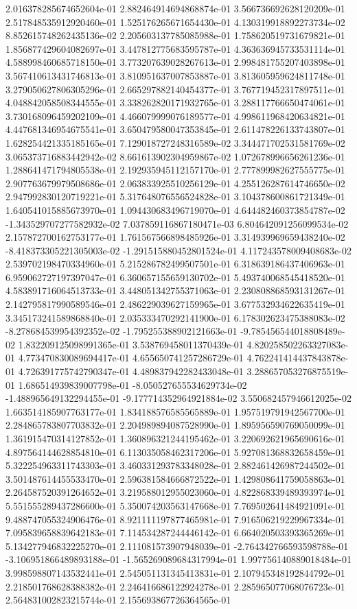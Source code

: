 2.016378285674652604e-01	2.882464914694868874e-01	3.566736692628120209e-01	2.517848535912920460e-01	1.525176265671654430e-01	4.130319918892273734e-02	8.852615748262435136e-02	2.205603137785085988e-01	1.758620519731679821e-01	1.856877429604082697e-01	3.447812775683595787e-01	4.363636945733531114e-01	4.588998460685718150e-01	3.773207639028267613e-01	2.998481755207403898e-01	3.567410613431746813e-01	3.810951637007853887e-01	3.813605959624811748e-01	3.279050627806305296e-01	2.665297882140454377e-01	3.767719452317897511e-01	4.048842058508344555e-01	3.338262820171932765e-01	3.288117766650474061e-01	3.730168096459202109e-01	4.466079999076189577e-01	4.998611968420634821e-01	4.447681346954675541e-01	3.650479580047353845e-01	2.611478226133743807e-01	1.628254421335185165e-01	7.129018727248316589e-02	3.344471702531581769e-02	3.065373716883442942e-02	8.661613902304959867e-02	1.072678996656261236e-01	1.288641471794805538e-01	2.192935945112157170e-01	2.777899982627555775e-01	2.907763679979508686e-01	2.063833925510256129e-01	4.255126287614746650e-02	2.947992830120719221e-01	5.317648076556524828e-01	3.104378600861721349e-01	1.640541015885673970e-01	1.094430683496719070e-01	4.644482460373854787e-02	-1.343529707277582932e-02	7.037859116867180471e-03	6.804642091256099534e-02	2.157872700162753177e-01	1.761567566898485926e-01	3.314939969659438240e-02	-8.418373305221305003e-02	-1.291515880452801524e-01	4.117243578009408683e-02	2.539702198470334960e-01	5.215286782499507501e-01	6.318639186437406963e-01	6.959062727197397047e-01	6.360657155659130702e-01	5.493740068545418520e-01	4.583891716064513733e-01	3.448051342755371063e-01	2.230808868593131267e-01	2.142795817990589546e-01	2.486229039627159965e-01	3.677532934622635419e-01	3.345173241589868840e-01	2.035333470292141900e-01	6.178302623475388083e-02	-8.278684539954392352e-02	-1.795255388902121663e-01	-9.785456544018808489e-02	1.832209125098991365e-01	3.538769458011370439e-01	4.820258502263327083e-01	4.773470830089694417e-01	4.655650741257286729e-01	4.762241414437843878e-01	4.726391775742790347e-01	4.489837942282433048e-01	3.288657053276875519e-01	1.686514939839007798e-01	-8.050527655534629734e-02	-1.488965649132294455e-01	-9.177714352964921884e-02	3.550682457946612025e-02	1.663514185907763177e-01	1.834188576585565889e-01	1.957519791942567700e-01	2.284865783807703832e-01	2.204989894087528990e-01	1.895956590769050099e-01	1.361915470314127852e-01	1.360896321244195462e-01	3.220692621965690616e-01	4.897564144628854810e-01	6.113035058462317206e-01	5.927081368832658459e-01	5.322254963311743303e-01	3.460331293783348028e-01	2.882461426987244502e-01	3.501487614455533470e-01	2.596381584666872522e-01	1.429808641759058863e-01	2.264587520391264652e-01	3.219588012955023060e-01	4.822868339489393974e-01	5.551555289437286600e-01	5.350074203563147668e-01	7.769502641484921091e-01	9.488747055324906476e-01	8.921111197877465981e-01	7.916506219229967334e-01	7.095839658839642183e-01	7.114534287244446142e-01	6.664020503393365269e-01	5.134277946832225270e-01	2.111081573907948039e-01	-2.764342766593598788e-01	-3.106951866489893188e-01	-1.565269089684317994e-01	1.997756140889018484e-01	3.998598807143532441e-01	2.545051131345413831e-01	2.107945348192844792e-01	2.218501768628388382e-01	2.246416686122924278e-01	2.285965077068076723e-01	2.564831002823215744e-01	2.155693867726364565e-01